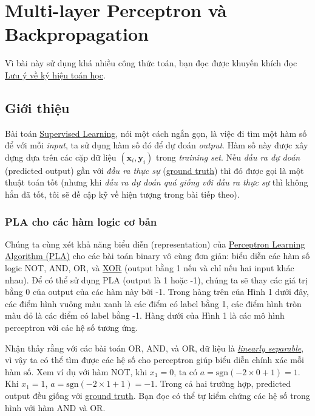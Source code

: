 \chapter{Multi-layer Perceptron và Backpropagation}

Vì bài này sử dụng khá nhiều công thức toán, bạn đọc được khuyến khích đọc \href{http://machinelearningcoban.com/math/#luu-y-ve-ky-hieu}{Lưu ý về ký hiệu toán học}. 
 
 
\section{Giới thiệu}
 
Bài toán \href{http://machinelearningcoban.com/2016/12/27/categories/#supervised-learning-hoc-co-giam-sat}{Supervised Learning}, nói một cách ngắn gọn, là việc đi tìm một hàm số để với mỗi \textit{input}, ta sử dụng hàm số đó để dự đoán \textit{output}. Hàm số này được xây dựng dựa trên các cặp dữ liệu $(\mathbf{x}_i, \mathbf{y}_i)$ trong \textit{training set}. Nếu \textit{đầu ra dự đoán} (predicted output) gần với \textit{đầu ra thực sự} (\href{http://machinelearningcoban.com/2017/01/08/knn/#ground-truth}{ground truth}) thì đó được gọi là một thuật toán tốt (nhưng khi \textit{đầu ra dự đoán quá giống với đầu ra thực sự} thì không hẳn đã tốt, tôi sẽ đề cập kỹ về hiện tượng trong bài tiếp theo). 
 
 
\subsection{PLA cho các hàm logic cơ bản}
 
Chúng ta cùng xét khả năng biểu diễn (representation) của \href{http://machinelearningcoban.com/2017/01/21/perceptron/}{Perceptron Learning Algorithm (PLA)} cho các bài toán binary vô cùng đơn giản: biểu diễn các hàm số logic NOT, AND, OR, và \href{https://en.wikipedia.org/wiki/Exclusive_or}{XOR} (output bằng 1 nếu và chỉ nếu hai input khác nhau). Để có thể sử dụng PLA (output là 1 hoặc -1), chúng ta sẽ thay các giá trị bằng 0 của output của các hàm này bởi -1. Trong hàng trên của Hình 1 dưới đây, các điểm hình vuông màu xanh là các điểm có label bằng 1, các điểm hình tròn màu đỏ là các điểm có label bằng -1. Hàng dưới của Hình 1 là các mô hình perceptron với các hệ số tương ứng. 
 
 Nhận thấy rằng với các bài toán OR, AND, và OR, dữ liệu là \href{http://machinelearningcoban.com/2017/01/21/perceptron/#bai-toan-perceptron}{\textit{linearly separable}}, vì vậy ta có thể tìm được các hệ số cho perceptron giúp biểu diễn chính xác mỗi hàm số. Xem ví dụ với hàm NOT, khi $x_1 = 0$, ta có $a = \text{sgn}(-2 \times 0+1) = 1$. Khi $x_1 = 1$, $a = \text{sgn}(-2\times 1 + 1) = -1$. Trong cả hai trường hợp, predicted output đều giống với \href{http://machinelearningcoban.com/2017/01/08/knn/#ground-truth}{ground truth}. Bạn đọc có thể tự kiểm chứng các hệ số trong hình với hàm AND và OR. 
 
